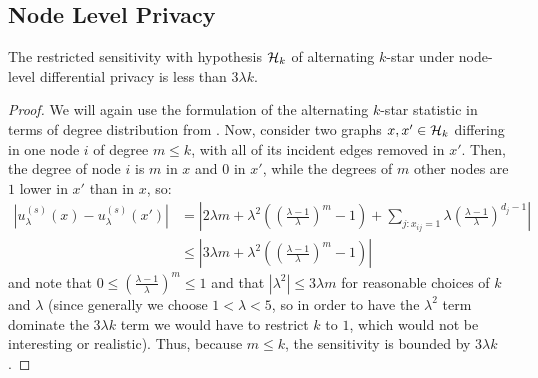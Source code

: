 \subsection{Node Level Privacy}

\begin{claim}
The restricted sensitivity with hypothesis $\mathcal{H}_k$ of alternating $k$-star under node-level differential privacy is less than $3\lambda k$.
\end{claim}
\begin{proof}
We will again use the formulation of the alternating $k$-star statistic in terms of degree distribution from . Now, consider two graphs $x, x' \in \mathcal{H}_k$ differing in one node $i$ of degree $m \leq k$, with all of its incident edges removed in $x'$. Then, the degree of node $i$ is $m$ in $x$ and $0$ in $x'$, while the degrees of $m$ other nodes are $1$ lower in $x'$ than in $x$, so:
\begin{align*}
|u_\lambda^{(s)}(x) - u_\lambda^{(s)}(x')| & = \left|2\lambda m + \lambda^2\left( \left(\frac{\lambda - 1}{\lambda}\right)^m - 1\right) +\sum_{j: x_{ij} = 1} \lambda \left(\frac{\lambda - 1}{\lambda}\right)^{d_j - 1}  \right| \\
& \leq \left|3\lambda m +  \lambda^2\left( \left(\frac{\lambda - 1}{\lambda}\right)^m - 1\right)\right|
\end{align*}
and note that $0 \leq \left(\frac{\lambda - 1}{\lambda}\right)^m \leq 1$ and that $|\lambda^2| \leq 3\lambda m$ for reasonable choices of $k$ and $\lambda$ (since generally we choose $1 < \lambda < 5$, so in order to have the $\lambda^2$ term dominate the $3\lambda k$ term we would have to restrict $k$ to $1$, which would not be interesting or realistic). Thus, because $m \leq k$, the sensitivity is bounded by $3\lambda k$.
\end{proof}

